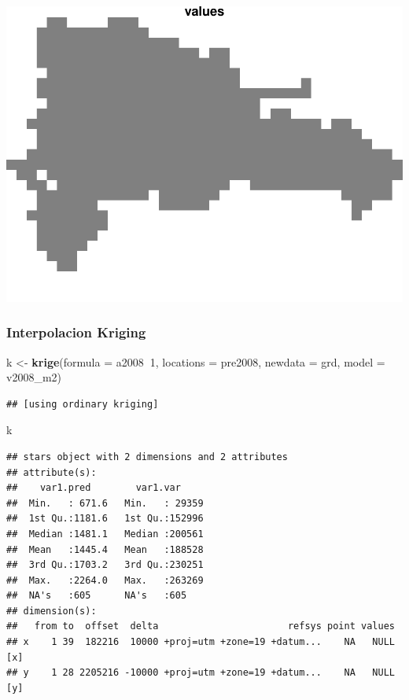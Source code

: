 \documentclass[11pt,]{article}
\newenvironment{Shaded}{\begin{snugshade}}{\end{snugshade}}
\newcommand{\KeywordTok}[1]{\textcolor[rgb]{0.13,0.29,0.53}{\textbf{#1}}}
\newcommand{\DataTypeTok}[1]{\textcolor[rgb]{0.13,0.29,0.53}{#1}}
\newcommand{\DecValTok}[1]{\textcolor[rgb]{0.00,0.00,0.81}{#1}}
\newcommand{\StringTok}[1]{\textcolor[rgb]{0.31,0.60,0.02}{#1}}
\newcommand{\OperatorTok}[1]{\textcolor[rgb]{0.81,0.36,0.00}{\textbf{#1}}}
\newcommand{\NormalTok}[1]{#1}
\begin{document}
\includegraphics{proyecto_files/figure-latex/unnamed-chunk-35-1.pdf}

\subsubsection{Interpolacion Kriging}\label{interpolacion-kriging}

\begin{Shaded}
\begin{Highlighting}[]
\NormalTok{k <-}\StringTok{ }\KeywordTok{krige}\NormalTok{(}\DataTypeTok{formula =}\NormalTok{ a2008}\OperatorTok{~}\DecValTok{1}\NormalTok{, }\DataTypeTok{locations =}\NormalTok{ pre2008, }\DataTypeTok{newdata =}\NormalTok{ grd, }\DataTypeTok{model =}\NormalTok{ v2008_m2)}
\end{Highlighting}
\end{Shaded}

\begin{verbatim}
## [using ordinary kriging]
\end{verbatim}

\begin{Shaded}
\begin{Highlighting}[]
\NormalTok{k}
\end{Highlighting}
\end{Shaded}

\begin{verbatim}
## stars object with 2 dimensions and 2 attributes
## attribute(s):
##    var1.pred        var1.var      
##  Min.   : 671.6   Min.   : 29359  
##  1st Qu.:1181.6   1st Qu.:152996  
##  Median :1481.1   Median :200561  
##  Mean   :1445.4   Mean   :188528  
##  3rd Qu.:1703.2   3rd Qu.:230251  
##  Max.   :2264.0   Max.   :263269  
##  NA's   :605      NA's   :605     
## dimension(s):
##   from to  offset  delta                       refsys point values    
## x    1 39  182216  10000 +proj=utm +zone=19 +datum...    NA   NULL [x]
## y    1 28 2205216 -10000 +proj=utm +zone=19 +datum...    NA   NULL [y]
\end{verbatim}
\end{document}
